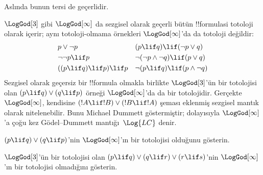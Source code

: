 \documentclass[../../../include/open-logic-section]{subfiles}
\begin{document}
Aslında bunun tersi de geçerlidir.

$\LogGod[3]$ gibi $\LogGod[\infty]$ da sezgisel olarak geçerli bütün
!!{formula}s{}i totoloji olarak içerir; aynı totoloji-olmama örnekleri
$\LogGod[\infty]$'da da totoloji değildir:
\begin{align*}
  & p \lor \lnot p && (p \lif q) \lif (\lnot p \lor q) \\
  & \lnot\lnot p \lif p && \lnot(\lnot p \land \lnot q) \lif (p \lor q) \\
  & ((p \lif q) \lif p) \lif p && \lnot(p \lif q) \lif (p \land \lnot q)
\end{align*}
Sezgisel olarak geçersiz bir !!{formula} olmakla birlikte $\LogGod[3]$'ün
bir totolojisi olan $(p \lif q) \lor (q \lif p)$ örneği
$\LogGod[\infty]$'da da bir totolojidir. Gerçekte $\LogGod[\infty]$,
kendisine
$(!A \lif !B) \lor (!B \lif !A)$ şeması eklenmiş sezgisel mantık olarak
nitelenebilir. Bunu Michael Dummett göstermiştir; dolayısıyla
$\LogGod[\infty]$'a çoğu kez G\"odel--Dummett mantığı~$\Log{LC}$ denir.

\begin{prob}
  $(p \lif q) \lor (q \lif p)$'nin $\LogGod[\infty]$'ın bir totolojisi
  olduğunu gösterin.
\end{prob}

\begin{prob}
  $\LogGod[3]$'ün bir totolojisi olan
  $(p \lif q) \lor (q \lif r) \lor (r \lif s)$'nin
  $\LogGod[\infty]$'ın bir totolojisi olmadığını gösterin.
\end{prob}
\end{document}

